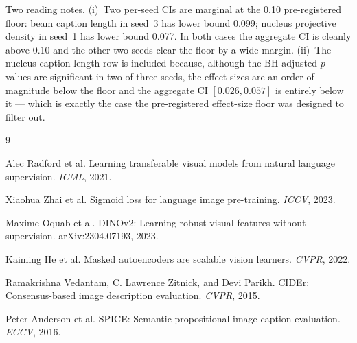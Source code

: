 \documentclass[11pt]{article}
\begin{document}
Two reading notes. (i)~Two per-seed CIs are marginal at the 0.10
pre-registered floor: beam caption length in seed~3 has lower bound
0.099; nucleus projective density in seed~1 has lower bound 0.077. In both cases the aggregate CI is cleanly above 0.10
and the other two seeds clear the floor by a wide margin. (ii)~The
nucleus caption-length row is included because, although the
BH-adjusted \(p\)-values are significant in two of three seeds, the effect
sizes are an order of magnitude below the floor and the aggregate CI
\([0.026, 0.057]\) is entirely below it --- which is exactly the case the
pre-registered effect-size floor was designed to filter out.

\begin{thebibliography}{9}

Alec Radford et al.
\newblock Learning transferable visual models from natural language supervision.
\newblock \emph{ICML}, 2021.

Xiaohua Zhai et al.
\newblock Sigmoid loss for language image pre-training.
\newblock \emph{ICCV}, 2023.

Maxime Oquab et al.
\newblock DINOv2: Learning robust visual features without supervision.
\newblock arXiv:2304.07193, 2023.

Kaiming He et al.
\newblock Masked autoencoders are scalable vision learners.
\newblock \emph{CVPR}, 2022.

Ramakrishna Vedantam, C. Lawrence Zitnick, and Devi Parikh.
\newblock CIDEr: Consensus-based image description evaluation.
\newblock \emph{CVPR}, 2015.

Peter Anderson et al.
\newblock SPICE: Semantic propositional image caption evaluation.
\newblock \emph{ECCV}, 2016.

\end{thebibliography}
\end{document}
